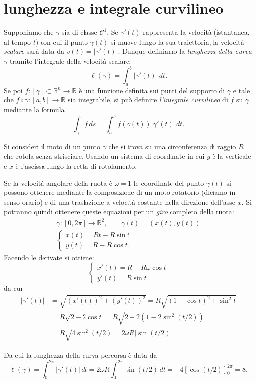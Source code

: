 \documentclass[italian,a4paper]{scrartcl}
\newcommand{\RR}{{\mathbb R}}
\newcommand{\C}{{\mathcal C}}
\newcommand{\defeq}{=}
\begin{document}
\section{lunghezza e integrale curvilineo}
Supponiamo che $\gamma$ sia di classe $\C^1$.
Se $\gamma'(t)$ rappresenta la velocità (istantanea, al tempo $t$) con
cui il punto $\gamma(t)$ si muove lungo la sua traiettoria, la
velocità \emph{scalare} sarà data da $v(t) = \lvert \gamma'(t)
\rvert$. 
Dunque definiamo la \emph{lunghezza della curva} $\gamma$ tramite
l'integrale della velocità scalare:
\[
\ell(\gamma) \defeq \int_a^b \lvert \gamma'(t)\rvert \, dt.
\]
Se poi $f\colon [\gamma]\subset \RR^n \to \RR$ è una funzione definita
sui punti del supporto di $\gamma$ e tale che
$f\circ \gamma\colon [a,b]\to \RR$ sia integrabile, si può definire 
\emph{l'integrale curvilineo} di $f$ su $\gamma$ mediante la formula
\[
\int_\gamma f\, ds \defeq \int_a^b f(\gamma(t)) \lvert
\gamma'(t)\rvert\, dt.
\]

\begin{example}[la cicloide]
Si consideri il moto di un punto $\gamma$ che si trova su una
circonferenza di raggio $R$ che rotola senza strisciare. Usando un
sistema di coordinate in cui $y$ è la verticale e $x$ è l'ascissa
lungo la retta di rotolamento.

Se la velocità angolare della ruota è $\omega=1$ le coordinate del punto
$\gamma(t)$ si possono ottenere mediante la composizione di un moto
rotatorio (diciamo in senso orario) e di una traslazione a velocità
costante nella direzione dell'asse $x$. Si potranno quindi ottenere
queste equazioni per un \emph{giro} completo della ruota:
\begin{gather*}
\gamma\colon [0,2\pi] \to \RR^2,\qquad \gamma(t)=(x(t), y(t))\\
\begin{cases}
x(t) = R t - R \sin t \\
y(t) = R - R \cos t.
\end{cases}
\end{gather*}
Facendo le derivate si ottiene:
\[
\begin{cases}
x'(t) = R - R \omega \cos t \\
y'(t) = R \sin t
\end{cases}
\]
da cui
\begin{align*}
 \lvert\gamma'(t)\rvert & = \sqrt{(x'(t))^2 + (y'(t))^2}
 =  R \sqrt{ (1-\cos t)^2 + \sin^2 t} \\
 & =  R \sqrt{2 - 2 \cos t}
 =  R \sqrt{2 - 2 (1 - 2\sin^2 (t/2))} \\
 & =  R \sqrt{4 \sin^2(t/2)} = 2\omega R \lvert \sin(t/2)\rvert.
\end{align*}

Da cui la lunghezza della curva percorsa è data da
\[
\ell(\gamma) = \int_0^{2\pi} \lvert \gamma'(t)\rvert \, dt
 = 2 \omega R \int_0^{2\pi} \sin(t/2)\, dt = -4 [ \cos(t/2)]_0^{2\pi}
 = 8.
\]
\end{example}
\end{document}
